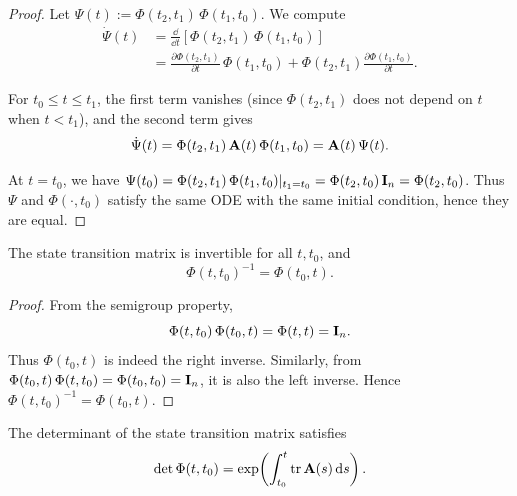 \begin{proof}
Let $\Psi(t) := \Phi(t_2,t_1)\,\Phi(t_1,t_0)$. We compute
\begin{align}
\dot{\Psi}(t) &= \frac{\dd}{\dd t}\left[\Phi(t_2,t_1)\,\Phi(t_1,t_0)\right]\\
&= \frac{\partial \Phi(t_2,t_1)}{\partial t}\,\Phi(t_1,t_0) + \Phi(t_2,t_1)\frac{\partial \Phi(t_1,t_0)}{\partial t}.
\end{align}

For $t_0 \leq t \leq t_1$, the first term vanishes (since $\Phi(t_2,t_1)$ does not depend on $t$ when $t<t_1$),
and the second term gives
\begin{equation}
\dot{\Psi}(t) = \Phi(t_2,t_1)\,\mathbf{A}(t)\,\Phi(t_1,t_0) = \mathbf{A}(t)\,\Psi(t).
\end{equation}

At $t=t_0$, we have $\Psi(t_0) = \Phi(t_2,t_1)\,\Phi(t_1,t_0)|_{t_1=t_0} = \Phi(t_2,t_0)\,\mathbf{I}_n = \Phi(t_2,t_0)$.
Thus $\Psi$ and $\Phi(\cdot,t_0)$ satisfy the same ODE with the same initial condition, hence they are equal.
\end{proof}

\begin{theorem}[Invertibility]
\label{thm:ch2:invertibility}
The state transition matrix is invertible for all $t, t_0$, and
\begin{equation}
\Phi(t,t_0)^{-1} = \Phi(t_0,t).
\label{eq:ch2:inverse}
\end{equation}
\end{theorem}

\begin{proof}
From the semigroup property,
\[
\Phi(t,t_0)\,\Phi(t_0,t) = \Phi(t,t) = \mathbf{I}_n.
\]
Thus $\Phi(t_0,t)$ is indeed the right inverse. Similarly, from $\Phi(t_0,t)\,\Phi(t,t_0) = \Phi(t_0,t_0) = \mathbf{I}_n$,
it is also the left inverse. Hence $\Phi(t,t_0)^{-1} = \Phi(t_0,t)$.
\end{proof}

\begin{theorem}
\label{thm:ch2:liouville}
The determinant of the state transition matrix satisfies
\begin{equation}
\det\Phi(t,t_0) = \exp\!\left(\int_{t_0}^{t}\operatorname{tr}\mathbf{A}(s)\,\mathrm{d} s\right).
\label{eq:ch2:liouville}
\end{equation}
\end{theorem}

